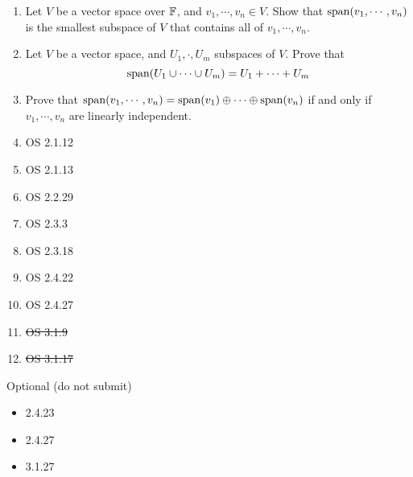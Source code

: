 \documentclass{amsart}
\begin{document}
	\begin{enumerate}
		\item Let $V$ be a vector space over $\mathbb{F}$, and $v_1,\cdots,v_n\in V$. Show that $\operatorname{span} (v_1,\cdots,v_n)$ is the  smallest subspace of $V$ that contains all of $v_1,\cdots,v_n$.
		\item Let $V$ be a vector space, and $U_1,\cdot,U_m$ subspaces of $V$. Prove that
		\[\operatorname{span}(U_1\cup \cdots \cup U_m) = U_1+\cdots+U_m\]
		\item Prove that $\operatorname{span}(v_1,\cdots,v_n) = \operatorname{span}(v_1)\oplus \cdots \oplus \operatorname{span}(v_n)$ if and only if $v_1,\cdots,v_n$ are linearly independent. 
		\item OS 2.1.12
		\item OS 2.1.13
		\item OS 2.2.29
		\item OS 2.3.3
		\item OS 2.3.18
		\item OS 2.4.22
		\item OS 2.4.27
		\item \st{OS 3.1.9}
		\item \st{OS 3.1.17}
	
	 	\end{enumerate}
	 	Optional (do not submit)
	 	\begin{itemize}
	 		\item 2.4.23
	 		\item 2.4.27
	 		\item 3.1.27
	 	\end{itemize}
	
\end{document}
